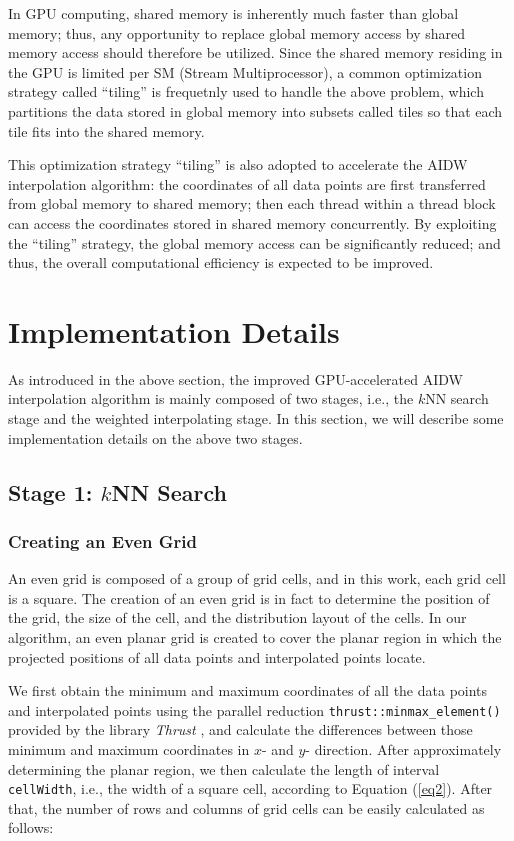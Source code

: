 \documentclass[final,5p,times,twocolumn,authoryear]{elsarticle}
\begin{document}
			In GPU computing, shared memory is inherently much faster than global 
			memory; thus, any opportunity to replace global memory access by shared 
			memory access should therefore be utilized. Since the shared memory 
			residing in the GPU is limited per SM (Stream Multiprocessor), a common 
			optimization strategy called ``tiling'' is frequetnly used to handle the 
			above problem, which partitions the data stored in global memory into 
			subsets called tiles so that each tile fits into the shared memory.
			
			This optimization strategy ``tiling'' is also adopted to accelerate the AIDW 
			interpolation algorithm: the coordinates of all data points are first 
			transferred from global memory to shared memory; then each thread within a 
			thread block can access the coordinates stored in shared memory 
			concurrently. By exploiting the ``tiling'' strategy, the global memory 
			access can be significantly reduced; and thus, the overall computational 
			efficiency is expected to be improved.
			
			\section{Implementation Details}
			As introduced in the above section, the improved GPU-accelerated AIDW 
			interpolation algorithm is mainly composed of two stages, i.e., the $k$NN 
			search stage and the weighted interpolating stage. In this section, we will 
			describe some implementation details on the above two stages. 
			
			\subsection{Stage 1: $k$NN Search}
			\subsubsection{Creating an Even Grid}
			
			An even grid is composed of a group of grid cells, and in this work, each 
			grid cell is a square. The creation of an even grid is in fact to determine 
			the position of the grid, the size of the cell, and the distribution layout 
			of the cells. In our algorithm, an even planar grid is created to cover the 
			planar region in which the projected positions of all data points and 
			interpolated points locate. 
			
			We first obtain the minimum and maximum coordinates of all the data points 
			and interpolated points using the parallel reduction 
			\texttt{thrust::minmax{\_}element()} provided by the library \textit{Thrust} \citep{30Bell2012359}, and 
			calculate the differences between those minimum and maximum coordinates in 
			$x$- and $y$- direction. After approximately determining the planar region, we 
			then calculate the length of interval \texttt{cellWidth}, i.e., the width of a square 
			cell, according to Equation (\ref{eq2}). After that, the number of rows and columns 
			of grid cells can be easily calculated as follows:
			
\end{document}
